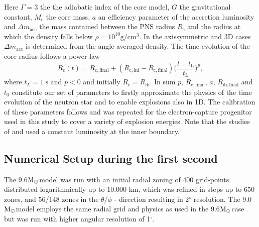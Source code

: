 \documentclass[fleqn,usenatbib]{mnras}
\newcommand{\solm}{\xspace\ensuremath{\rm{M_{\odot}}}}
\begin{document}
Here $\Gamma = 3$ the the adiabatic index of the core model, $G$ the gravitational constant, $M_{\mathrm{c}}$ the core mass, $a$ an efficiency parameter of the accretion luminosity and $\Delta m_{\mathrm{acc}}$ the mass contained between the PNS radius $R_\mathrm{c}$ and the radius at which the density falls below $\rho=10^{10}\mathrm{g/cm^3}$. 
In the axissymmetric and 3D cases $\Delta m_{\mathrm{acc}}$ is determined from the angle averaged density.
The time evolution of the core radius follows a power-law 
\begin{equation}
    R_{\mathrm{c}}(t) =R_{\mathrm{c,final}} + (R_{\mathrm{c,ini}} - R_{\mathrm{c,final}}) \Big( \frac{t+t_{\mathrm{L}}} {t_{\mathrm{L}}}  \Big)^p,
\end{equation}
where $t_L = 1 \; \mathrm{s}$ and $p < 0$ and  initially $R_{\mathrm{c}} = R_{\mathrm{ib}}$.
In sum $p$, $R_{\mathrm{c,final}}$, $a$, $R_{\mathrm{ib,final}}$ and $t_0$ constitute our set of parameters to firstly approximate the physics of the time evolution of the neutron star and to enable explosions also in 1D.
The calibration of these parameters follows \cite{Ertla} and was repeated for the electron-capture progenitor used in this study to cover a variety of explosion energies.
Note that the studies of \cite{Wongwathanarat2015} and \cite{Gessner2018} used a constant luminosity at the inner boundary. 

\subsection{Numerical Setup during the first second}

The 9.6\solm model was run with an initial radial zoning of 400 grid-points distributed logarithmically up to 10.000 km, which was refined in steps up to 650 zones, and 56/148 zones in the $\theta/\phi$ - direction resulting in 2$^\circ$ resolution.
The 9.0\solm model employs the same radial grid and physics as used in the 9.6\solm case but was run with higher angular resolution of 1$^\circ$.
\end{document}
